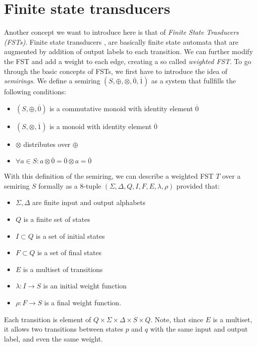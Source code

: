 \section{Finite state transducers}
\label{fst-desc}
Another concept we want to introduce here is that of \textit{Finite State Trasducers (FSTs)}.
Finite state transducers \cite{mohri1997finite}, are basically finite state automata that are augmented by addition of output labels to each transition.
We can further modify the FST and add a weight to each edge, creating a so called \textit{weighted FST}.
To go through the basic concepts of FSTs, we first have to introduce the idea of \textit{semirings}.
We define a semiring $(S,\oplus,\otimes,\overline{0},\overline{1})$ as a system that fullfills the following conditions:
\begin{nobreak}
\begin{itemize}
\item $(S,\oplus,\overline{0})$ is a commutative monoid with identity element $\overline{0}$
\item $(S,\otimes,\overline{1})$ is a monoid with identity element $\overline{0}$
\item $\otimes $ distributes over $\oplus$
\item $\forall a \in S: a \otimes \overline{0} = \overline{0} \otimes a = \overline{0}$
\end{itemize}
\end{nobreak}
With this definition of the semiring, we can describe a weighted FST \cite{mohri2009weighted} $T$ over a semiring $S$ formally as a 8-tuple $(\Sigma,\Delta,Q,I,F,E,\lambda,\rho)$ provided that:
\begin{nobreak}
\begin{itemize}
\item $\Sigma, \Delta$ are finite input and output alphabets
\item $Q$ is a finite set of states
\item $I \subset Q$ is a set of initial states
\item $F \subset Q$ is a set of final states
\item $E$ is a multiset of transitions
\item $\lambda: I \rightarrow S$ is an initial weight function
\item $\rho: F \rightarrow S$ is a final weight function.
\end{itemize}
\end{nobreak}
Each transition is element of $Q \times \Sigma \times \Delta \times S \times Q$.
Note, that since $E$ is a multiset, it allows two transitions between states $p$ and $q$ with the same input and output label, and even the same weight.
